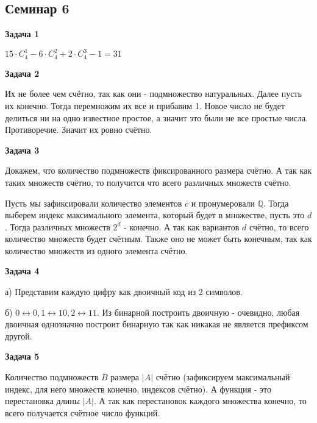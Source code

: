 \subsection{Семинар 6}
\begin{center}
\textbf{Задача 1}
\end{center}
$\displaystyle 15\cdotp C_{4}^{1} -6\cdotp C_{4}^{2} +2\cdotp C_{4}^{3} -1=31$
\begin{center}


\textbf{Задача 2}
\end{center}
Их не более чем счётно, так как они - подмножество натуральных. Далее пусть их конечно. Тогда перемножим их все и прибавим 1. Новое число не будет делиться ни на одно известное простое, а значит это были не все простые числа. Противоречие. Значит их ровно счётно.

\begin{center}
\textbf{Задача 3}
\end{center}
Докажем, что количество подмножеств фиксированного размера счётно. А так как таких множеств счётно, то получится что всего различных множеств счётно.

Пусть мы зафиксировали количество элементов $\displaystyle c$ и пронумеровали $\displaystyle \mathbb{Q}$. Тогда выберем индекс максимального элемента, который будет в множестве, пусть это $\displaystyle d$. Тогда различных множеств $\displaystyle 2^{d}$ - конечно. А так как вариантов $\displaystyle d$ счётно, то всего количество множеств будет счётным. Также оно не может быть конечным, так как количество множеств из одного элемента счётно.

\begin{center}
\textbf{Задача 4}
\end{center}
а) Представим каждую цифру как двоичный код из 2 символов.

б) $\displaystyle 0\leftrightarrow 0,1\leftrightarrow 10,2\leftrightarrow 11$. Из бинарной построить двоичную - очевидно, любая двоичная однозначно построит бинарную так как никакая не является префиксом другой.

\begin{center}
\textbf{Задача 5}
\end{center}
Количество подмножеств $\displaystyle B$ размера $\displaystyle |A|$ счётно (зафиксируем максимальный индекс, для него множеств конечно, индексов счётно). А функция - это перестановка длины $\displaystyle |A|$. А так как перестановок каждого множества конечно, то всего получается счётное число функций.

